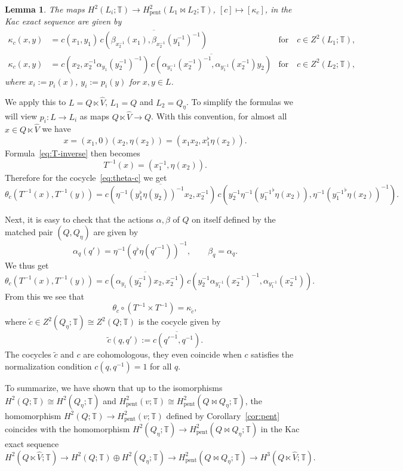 \documentclass[a4paper,11pt,reqno]{amsart}
\numberwithin{equation}{section}
\newtheorem{lemma}[theorem]{Lemma}
\theoremstyle{remark}
\theoremstyle{definition}
\newcommand\T{{\mathbb T}}
\newcommand\pent{\mathrm{pent}}
\begin{document}
\begin{lemma}
The maps $H^2(L_i;\T)\to H^2_\pent(L_1\bowtie L_2;\T)$, $[c]\mapsto[\kappa_c]$, in the Kac exact sequence are given by
\begin{align*}
\kappa_c(x,y)&=c(x_1,y_1)\,\overline{c(\beta_{x_2^{-1}}(x_1),\beta_{x_2^{-1}}(y_1^{-1})^{-1})} &\text{for}\quad c\in Z^2(L_1;\T),\\
\kappa_c(x,y)&=c(x_2,x_2^{-1}\alpha_{y_1}(y_2^{-1})^{-1})\,\overline{c(\alpha_{y_1^{-1}}(x_2^{-1})^{-1},\alpha_{y_1^{-1}}(x_2^{-1})y_2)}&\text{for}\quad c\in Z^2(L_2;\T),
\end{align*}
where $x_i:=p_i(x)$, $y_i:=p_i(y)$ for $x,y\in L$.
\end{lemma}

We apply this to $L=Q\ltimes\hat V$, $L_1=Q$ and $L_2=Q_\eta$. To simplify the formulas we will view $p_i\colon L\to L_i$ as maps $Q\ltimes\hat V\to Q$. With this convention, for almost all $x\in Q\ltimes\hat V$ we have
$$
x=(x_1,0)(x_2,\eta(x_2))=(x_1x_2,x_1^\flat\eta(x_2)).
$$
Formula~\eqref{eq:T-inverse} then becomes
$$
T^{-1}(x)=(x_1^{-1},\eta(x_2)).
$$
Therefore for the cocycle~\eqref{eq:theta-c} we get
$$
\theta_c(T^{-1}(x),T^{-1}(y))=
\overline{c(\eta^{-1}(y_1^\flat\eta(y_2))^{-1}x_2,x_2^{-1})}\,
c(y_2^{-1}\eta^{-1}({y_1^{-1}}^\flat\eta(x_2)),\eta^{-1}({y_1^{-1}}^\flat\eta(x_2))^{-1}).
$$

Next, it is easy to check that the actions $\alpha,\beta$ of $Q$ on itself defined by the matched pair $(Q,Q_\eta)$ are given by
$$
\alpha_q(q')=\eta^{-1}(q^\flat\eta({q'}^{-1}))^{-1},\qquad\beta_q=\alpha_q.
$$
We thus get
$$
\theta_c(T^{-1}(x),T^{-1}(y))=
\overline{c(\alpha_{y_1}(y_2^{-1})x_2,x_2^{-1})}\,
c(y_2^{-1}\alpha_{y_1^{-1}}(x_2^{-1})^{-1},\alpha_{y_1^{-1}}(x_2^{-1})).
$$
From this we see that
$$
\theta_c\circ(T^{-1}\times T^{-1})=\kappa_{\tilde c},
$$
where $\tilde c\in Z^2(Q_\eta;\T)\cong Z^2(Q;\T)$ is the cocycle given by
$$
\tilde c(q,q'):=\overline{c({q'}^{-1},q^{-1})}.
$$
The cocycles $\tilde c$ and $c$ are cohomologous, they even coincide when $c$ satisfies the normalization condition $c(q,q^{-1})=1$ for all $q$.

To summarize, we have shown that up to the isomorphisms $H^2(Q;\T)\cong H^2(Q_\eta;\T)$ and $H^2_\pent(v;\T)\cong H^2_\pent(Q\bowtie Q_\eta;\T)$, the homomorphism $H^2(Q;\T)\to H^2_\pent(v;\T)$ defined by Corollary~\ref{cor:pent} coincides with the homomorphism $H^2(Q_\eta;\T)\to H^2_\pent(Q\bowtie Q_\eta;\T)$ in the Kac exact sequence
$$
H^2(Q\ltimes\hat V;\T)\to H^2(Q;\T)\oplus H^2(Q_\eta;\T)\to H^2_\pent(Q\bowtie Q_\eta;\T)\to H^3(Q\ltimes\hat V;\T).
$$
\end{document}
